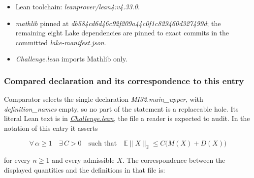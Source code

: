 \documentclass[11pt,a4paper]{article}
\providecommand{\tightlist}{\setlength{\itemsep}{0pt}\setlength{\parskip}{0pt}}
\begin{document}
\begin{itemize}
\tightlist
\item
  Lean toolchain: \textit{leanprover/lean4:v4.33.0}.
\item
  \textit{mathlib} pinned at
  \textit{db584cd6d46c92f209a44c0f1c829460d327499d}; the remaining eight
  Lake dependencies are pinned to exact commits in the committed
  \textit{lake-manifest.json}.
\item
  \textit{Challenge.lean} imports Mathlib only.
\end{itemize}

\subsubsection{Compared declaration and its correspondence to this
entry}\label{compared-declaration-and-its-correspondence-to-this-entry}

Comparator selects the single declaration \textit{MI32.main\_upper},
with \textit{definition\_names} empty, so no part of the statement is a
replaceable hole. Its literal Lean text is in
\href{https://github.com/DiarHaidary/Spectral-norms-of-independent-entries-with-regular-moment-growth/blob/762bd5ec5050a96f5e6ba3926b6cda4816fcd4b0/Challenge.lean}{\textit{Challenge.lean}},
the file a reader is expected to audit. In the notation of this entry it
asserts

\[\forall\,\alpha\ge1\quad\exists\,C>0\quad\text{such that}\quad
\mathbb E\|X\|_2\le C\bigl(M(X)+D(X)\bigr)\]

for every \(n\ge1\) and every admissible \(X\). The correspondence
between the displayed quantities and the definitions in that file is:
\end{document}
